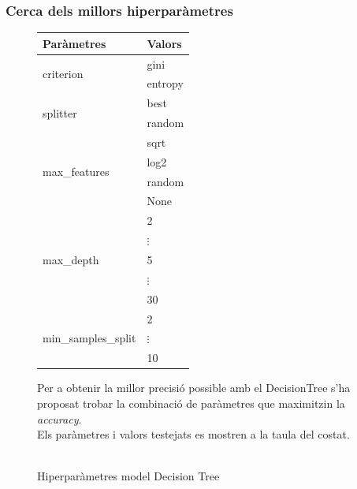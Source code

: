 \documentclass[a4paper, 11pt]{article}
\begin{document}
\subsubsection{Cerca dels millors hiperparàmetres}
\label{hiper_decisiontree}
\begin{figure}[h] %
\begin{minipage}{8cm} %
\begin{center} %
    \begin{tabular}{l|l}
        \textbf{Paràmetres} & \textbf{Valors} \\\hline\hline
        \multirow{2}{*}{criterion} & gini\\
        &\cellcolor{lightapricot}entropy\\ \hline
        \multirow{2}{*}{splitter} & \cellcolor{lightapricot}best\\
        & random \\ \hline
        \multirow{4}{*}{max\_features} & \cellcolor{lightapricot}sqrt\\
        & log2 \\ & random \\ & None \\ \hline
        \multirow{5}{*}{max\_depth} & 2\\
        & $\vdots$ \\ 
        & \cellcolor{lightapricot}5 \\ 
        & $\vdots$  \\ 
        & 30 \\\hline
        \multirow{4}{*}{min\_samples\_split} & \cellcolor{lightapricot}2\\
        & $\vdots$ \\ 
        & 10 \\
    \end{tabular}
    \caption{Hiperparàmetres model Decision Tree}
    \label{tab:afins}
\end{center}
\end{minipage} %
\hspace{2em}
\begin{minipage}{6.5cm} %
Per a obtenir la millor precisió possible amb el DecisionTree s'ha proposat trobar la combinació de paràmetres que maximitzin la \textit{accuracy}.\\ Els paràmetres i valors testejats es mostren a la taula del costat.\\\\

\end{minipage}
\end{figure}
\end{document}
